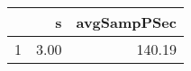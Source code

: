\begin{table}[h]
\centering
\begin{tabular}{rrr}
  \hline
 & s & avgSampPSec \\ 
  \hline
1 & 3.00 & 140.19 \\ 
   \hline
\end{tabular}
\end{table}
